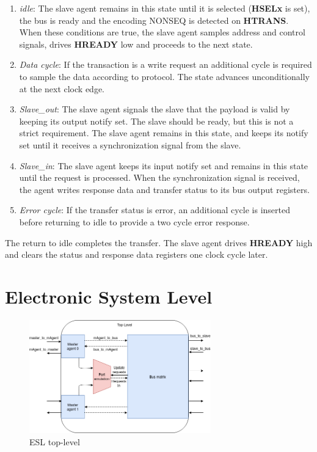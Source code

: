\begin{enumerate}
 \item \textit{idle}: The slave agent remains in this state until it is selected (\textbf{HSELx} is set), the bus is ready and the encoding NONSEQ is detected on \textbf{HTRANS}. When these conditions are true, the slave agent samples address and control signals, drives \textbf{HREADY} low and proceeds to the next state. 
 \item \textit{Data cycle}: If the transaction is a write request an additional cycle is required to sample the data according to protocol. The state advances unconditionally at the next clock edge.
 \item \textit{Slave\_out}: The slave agent signals the slave that the payload is valid by keeping its output notify set. The slave should be ready, but this is not a strict requirement. The slave agent remains in this state, and keeps its notify set until it receives a synchronization signal from the slave.    
 \item \textit{Slave\_in}: The slave agent keeps its input notify set and remains in this state until the request is processed. When the synchronization signal is received, the agent writes response data and transfer status to its bus output registers. 
 \item \textit{Error cycle}: If the transfer status is error, an additional cycle is inserted before returning to idle to provide a two cycle error response. 
\end{enumerate}

The return to idle completes the transfer. The slave agent drives \textbf{HREADY} high and clears the status and response data registers one clock cycle later. 
\newpage 

\section{Electronic System Level}
\label{sec:syslev}
\begin{figure}[hbt]
    \begin{center}
        \includegraphics[width=0.7\textwidth]{figs/ESL/syslev_new.png}
    \end{center}
    \caption{ESL top-level}
    \label{fig:esl-top}
\end{figure}

